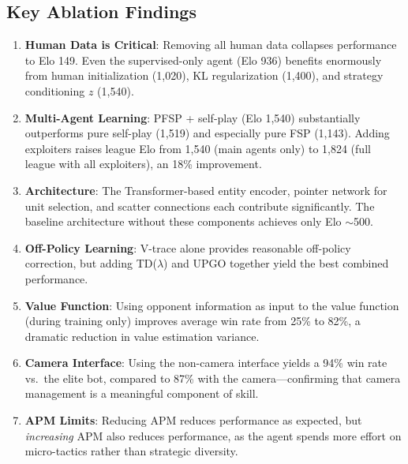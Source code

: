 \documentclass[11pt,a4paper]{article}
\begin{document}
\subsection{Key Ablation Findings}

\begin{enumerate}[nosep]
    \item \textbf{Human Data is Critical}: Removing all human data collapses performance to Elo 149. Even the supervised-only agent (Elo 936) benefits enormously from human initialization (1,020), KL regularization (1,400), and strategy conditioning $z$ (1,540).

    \item \textbf{Multi-Agent Learning}: PFSP + self-play (Elo 1,540) substantially outperforms pure self-play (1,519) and especially pure FSP (1,143). Adding exploiters raises league Elo from 1,540 (main agents only) to 1,824 (full league with all exploiters), an 18\% improvement.

    \item \textbf{Architecture}: The Transformer-based entity encoder, pointer network for unit selection, and scatter connections each contribute significantly. The baseline architecture without these components achieves only Elo $\sim$500.

    \item \textbf{Off-Policy Learning}: V-trace alone provides reasonable off-policy correction, but adding TD($\lambda$) and UPGO together yield the best combined performance.

    \item \textbf{Value Function}: Using opponent information as input to the value function (during training only) improves average win rate from 25\% to 82\%, a dramatic reduction in value estimation variance.

    \item \textbf{Camera Interface}: Using the non-camera interface yields a 94\% win rate vs.\ the elite bot, compared to 87\% with the camera---confirming that camera management is a meaningful component of skill.

    \item \textbf{APM Limits}: Reducing APM reduces performance as expected, but \emph{increasing} APM also reduces performance, as the agent spends more effort on micro-tactics rather than strategic diversity.
\end{enumerate}

\end{document}
